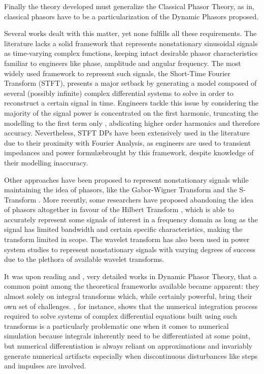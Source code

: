 	Finally the theory developed must generalize the Classical Phasor Theory, as in, classical phasors have to be a particularization of the Dynamic Phasors proposed.

	Several works dealt with this matter, yet none fulfills all these requirements. The literature lacks a solid framework that represents nonstationary sinusoidal signals as time-varying complex functions, keeping intact desirable phasor characteristics familiar to engineers like phase, amplitude and angular frequency. The most widely used framework to represent such signals, the Short-Time Fourier Transform (STFT), presents a major setback by generating a model composed of several (possibly infinite) complex differential systems to solve in order to reconstruct a certain signal in time. Engineers tackle this issue by considering the majority of the signal power is concentrated on the first harmonic, truncating the modelling to the first term only , abdicating higher order harmonics and therefore accuracy. Nevertheless, STFT DPs have been extensively used in the literature due to their proximity with Fourier Analysis, as engineers are used to transient impedances and power formul\ae brought by this framework, despite knowledge of their modelling inaccuracy.

	Other approaches have been proposed to represent nonstationary signals while maintaining the idea of phasors, like the Gabor-Wigner Transform  and the S-Transform . More recently, some researchers have proposed abandoning the idea of phasors altogether in favour of the Hilbert Transform , which is able to accurately represent some signals of interest in a frequency domain as long as the signal has limited bandwidth and certain specific characteristics, making the transform limited in scope. The wavelet transform has also been used in power system studies  to represent nonstationary signals with varying degrees of success due to the plethora of available wavelet transforms.

 	It was upon reading \cite{Mendes2020} and \cite{Henschel1999}, very detailed works in Dynamic Phasor Theory, that a common point among the theoretical frameworks available became apparent: they almost solely on integral transforms which, while certainly powerful, bring their own set of challenges. \cite{Henschel1999}, for instance, shows that the numerical integration process required to solve systems of complex differential equations built using such transforms is a particularly problematic one when it comes to numerical simulation because integrals inherently need to be differentiated at some point, but numerical differentiation is always reliant on approximations and invariably generate numerical artifacts especially when discontinuous disturbances like steps and impulses are involved.

